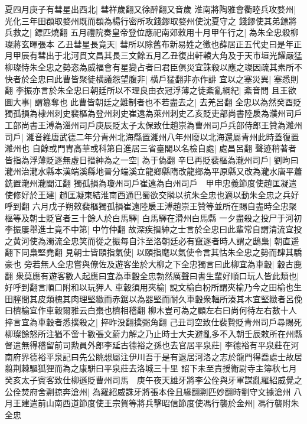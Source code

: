 夏四月庚子有彗星出西北|{
	彗祥歲翻又徐醉翻又音歲}
淮南將陶雅會衢睦兵攻婺州|{
	光化三年田頵取婺州既而頵為楊行密所攻錢鏐取婺州使沈夏守之}
錢鏐使其弟鏢將兵救之|{
	鏢匹燒翻}
五月禮院奏皇帝登位應祀南郊敕用十月甲午行之|{
	為朱全忠殺柳璨蔣玄暉張本}
乙丑彗星長竟天|{
	彗所以除舊布新易姓之徵也薛居正五代史曰是年正月甲辰有彗出于北河貫文昌其長三文餘五月乙丑復出軒轅大角及于天市垣光耀嚴猛}
柳璨恃朱全忠之勢恣為威福會有星變占者曰君臣俱災宜誅殺以應之璨因疏其素所不快者於全忠曰此曹皆聚徒横議怨望腹非|{
	横戶猛翻非亦作誹}
宜以之塞災異|{
	塞悉則翻}
李振亦言於朱全忠曰朝廷所以不理良由衣冠浮薄之徒紊亂綱紀|{
	紊音問}
且王欲圖大事|{
	謂簒奪也}
此曹皆朝廷之難制者也不若盡去之|{
	去羌呂翻}
全忠以為然癸酉貶獨孤損為棣州刺史裴樞為登州刺史崔遠為萊州刺史乙亥貶吏部尚書陸扆為濮州司戶工部尚書王溥為淄州司戶庚辰貶太子太保致仕趙崇為曹州司戶兵部侍郎王贊為濰州司戶|{
	濰音維唐武德二年分青州北海縣置濰州八年州廢以北海還屬青州此時蓋復置濰州也}
自餘或門胄高華或科第自進居三省臺閣以名檢自處|{
	處昌呂翻}
聲迹稍著者皆指為浮薄貶逐無虛日搢紳為之一空|{
	為于偽翻}
辛巳再貶裴樞為瀧州司戶|{
	劉昫曰瀧州治瀧水縣本漢端溪縣地晉分端溪立龍鄉縣隋改龍鄉為平原縣又改為瀧水唐平蕭銑置瀧州瀧閭江翻}
獨孤損為瓊州司戶崔遠為白州司戶　甲申忠義節度使趙匡凝遣使修好於王建|{
	趙匡凝東結淮南西通巴蜀欲交隣以抗朱全忠也適以動朱全忠之兵好呼到翻}
六月戊子朔敕裴樞獨孤損崔遠陸扆王溥趙崇王贊等並所在賜自盡時全忠聚樞等及朝士貶官者三十餘人於白馬驛|{
	白馬驛在滑州白馬縣}
一夕盡殺之投尸于河初李振屢舉進士竟不中第|{
	中竹仲翻}
故深疾搢紳之士言於全忠曰此輩常自謂清流宜投之黄河使為濁流全忠笑而從之振每自汴至洛朝廷必有竄逐者時人謂之鴟梟|{
	朝直遥翻下同梟堅堯翻}
見朝士皆頤指氣使|{
	以頤指麾以氣使令言其怙朱全忠之勢而肆其驕豪也}
旁若無人全忠嘗與僚佐及遊客坐於大柳之下全忠獨言曰此柳宜為車轂|{
	轂古鹿翻}
衆莫應有遊客數人起應曰宜為車轂全忠勃然厲聲曰書生輩好順口玩人皆此類也|{
	好呼到翻言順口附和以玩狎人}
車轂須用夾榆|{
	說文榆白枌所謂夾榆乃今之田榆也生田塍間其皮類槐其肉理堅緻而赤鋸以為器堅而耐久車轂衆輻所湊其木宜堅緻者呂俛曰櫅榆宜作車轂爾雅云白棗也櫅相稽翻}
柳木豈可為之顧左右曰尚何待左右數十人捽言宜為車轂者悉撲殺之|{
	捽昨没翻撲弼角翻}
己丑司空致仕裴贄貶青州司戶尋賜死柳璨餘怒所注猶不啻十數張文蔚力解之乃止時士大夫避亂多不入朝壬辰敕所在州縣督遣無得稽留前司勲員外郎李延古德裕之孫也去官居平泉莊|{
	李德裕有平泉莊在河南府界德裕平泉記曰先公眺想屬注伊川吾于是有退居河洛之志於龍門得喬處士故居翦荆棘驅狐狸而為之康駢曰平泉莊去洛城三十里}
詔下未至責授衛尉寺主簿秋七月癸亥太子賓客致仕柳遜貶曹州司馬　庚午夜天雄牙將李公佺與牙軍謀亂羅紹威覺之公佺焚府舍剽掠奔滄州|{
	為羅紹威誅牙將張本佺且緣翻剽匹妙翻時劉守文據滄州}
八月王建遣前山南西道節度使王宗賀等將兵擊昭信節度使馮行襲於金州|{
	馮行襲附朱全忠}
